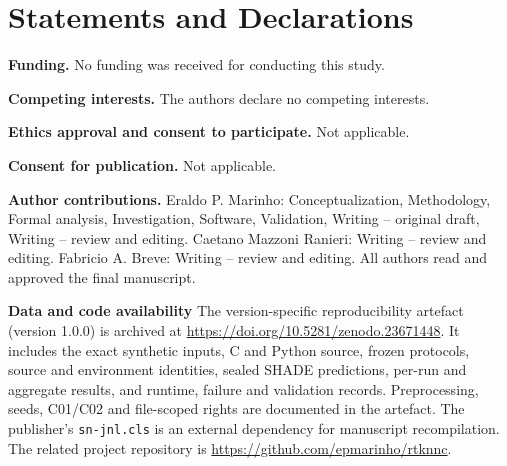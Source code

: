 \documentclass[pdflatex,sn-basic,Numbered]{sn-jnl}
\begin{document}
\section*{Statements and Declarations}

\noindent\textbf{Funding.}
No funding was received for conducting this study.

\medskip
\noindent\textbf{Competing interests.}
The authors declare no competing interests.

\medskip
\noindent\textbf{Ethics approval and consent to participate.}
Not applicable.

\medskip
\noindent\textbf{Consent for publication.}
Not applicable.

\medskip
\noindent\textbf{Author contributions.}
Eraldo P. Marinho: Conceptualization, Methodology, Formal analysis, Investigation, Software, Validation, Writing – original draft, Writing – review and editing. Caetano Mazzoni Ranieri: Writing – review and editing. Fabricio A. Breve: Writing – review and editing. All authors read and approved the final manuscript.

\medskip
\noindent\textbf{Data and code availability}
The version-specific reproducibility artefact (version 1.0.0) is archived at
\url{https://doi.org/10.5281/zenodo.23671448}.
It includes the exact synthetic inputs, C and Python source, frozen
protocols, source and environment identities, sealed SHADE predictions,
per-run and aggregate results, and runtime, failure and validation
records. Preprocessing, seeds, C01/C02 and file-scoped rights are
documented in the artefact. The publisher's \texttt{sn-jnl.cls} is an
external dependency for manuscript recompilation. The related project
repository is \url{https://github.com/epmarinho/rtknnc}.


\end{document}

